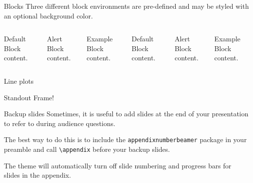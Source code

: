 \begin{frame}{Blocks}
	Three different block environments are pre-defined and may be styled with an
	optional background color.
	
	\begin{columns}[T,onlytextwidth]
		\begin{block}{Default}
			Block content.
		\end{block}
		
		\begin{alertblock}{Alert}
			Block content.
		\end{alertblock}
		
		\begin{exampleblock}{Example}
			Block content.
		\end{exampleblock}
		
		
		
		\begin{block}{Default}
			Block content.
		\end{block}
		
		\begin{alertblock}{Alert}
			Block content.
		\end{alertblock}
		
		\begin{exampleblock}{Example}
			Block content.
		\end{exampleblock}
		
	\end{columns}
\end{frame}
\begin{frame}{Line plots}
	\begin{figure}
	\end{figure}
\end{frame}

\begin{frame}
	Standout Frame!
\end{frame}


\appendix
\begin{frame}[fragile]{Backup slides}
	Sometimes, it is useful to add slides at the end of your presentation to
	refer to during audience questions.
	
	The best way to do this is to include the \verb|appendixnumberbeamer|
	package in your preamble and call \verb|\appendix| before your backup slides.
	
	The theme will automatically turn off slide numbering and progress bars for
	slides in the appendix.
\end{frame}
